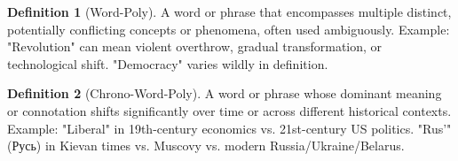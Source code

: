 \documentclass[11pt,a4paper]{article}
\theoremstyle{definition}
\newtheorem{definition}{Definition}[section]
\theoremstyle{remark}
\begin{document}
\begin{definition}[Word-Poly]
A word or phrase that encompasses multiple distinct, potentially conflicting concepts or phenomena, often used ambiguously. Example: "Revolution" can mean violent overthrow, gradual transformation, or technological shift. "Democracy" varies wildly in definition.
\end{definition}

\begin{definition}[Chrono-Word-Poly]
A word or phrase whose dominant meaning or connotation shifts significantly over time or across different historical contexts. Example: "Liberal" in 19th-century economics vs. 21st-century US politics. "Rus'" (\foreignlanguage{russian}{Русь}) in Kievan times vs. Muscovy vs. modern Russia/Ukraine/Belarus.
\end{definition}
\end{document}

